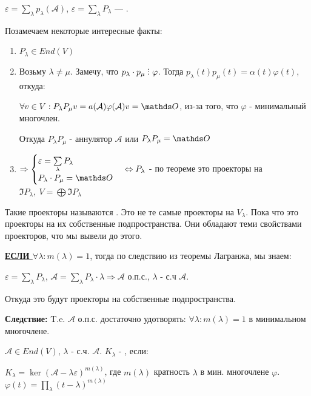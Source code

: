 $\varepsilon = \sum\limits_{\lambda}p_{\lambda}(\mathcal{A})$, $\varepsilon = \sum\limits_{\lambda}P_{\lambda}$ --- .

Позамечаем некоторые интересные факты:
\begin{enumerate}
    \item $P_{\lambda} \in End(V)$
    \item Возьму $\lambda \neq \mu$. Замечу, что $ p_{\lambda}\cdot p_{\mu} \divby \varphi$. Тогда $p_{\lambda}(t) p_{\mu}(t) = \alpha(t)\varphi(t)$, откуда:
    
    $\forall v \in V: P_{\lambda}P_{\mu}v =  a(\mathcal{A})\varphi(\mathcal{A})v = \zero$, из-за того, что $\varphi$ - минимальный многочлен.
    
    Откуда $ P_{\lambda}P_{\mu}$ - аннулятор $\mathcal{A}$ или $ P_{\lambda}P_{\mu} = \zero$

    \item $\Rightarrow \begin{cases}
    \varepsilon = \sum\limits_{\lambda}P_{\lambda}\\
    P_{\lambda}\cdot P_{\mu} =\zero 
\end{cases} \Leftrightarrow P_{\lambda}$  - по теореме это проекторы на $\Im P_{\lambda} , \ V= \bigoplus \Im P_{\lambda}$
\end{enumerate}

Такие проекторы называются . Это не те самые проекторы на $V_{\lambda}$. Пока что это проекторы на их собственные подпространства. Они обладают теми свойствами проекторов, что мы вывели до этого.

\textbf{\uline{ЕСЛИ  $\forall \lambda: m(\lambda)=1$}}, тогда по следствию из теоремы Лагранжа, мы знаем: 

$\varepsilon = \sum\limits_{\lambda}P_{\lambda} $, $\mathcal{A} = \sum\limits_{\lambda}P_{\lambda}\cdot \lambda \Rightarrow \mathcal{A}$ о.п.с., $\lambda$ - с.ч $\mathcal{A}$.

Откуда это будут проекторы на собственные подпространства.

\textbf{Следствие:} T.e. $\mathcal{A}$ о.п.с. достаточно удотворять: $\forall \lambda : m(\lambda) = 1$ в минимальном многочлене.

 $\mathcal{A} \in End(V)$, $\lambda$ - с.ч. $\mathcal{A}$. $K_{\lambda}$ - , если:

$K_{\lambda} = \ker (\mathcal{A}- \lambda \varepsilon)^{m(\lambda)}$, где $m(\lambda)$ кратность $\lambda$ в мин. многочлене $\varphi$. $\varphi(t)=\prod\limits_{\lambda}(t-\lambda)^{m(\lambda)}$

